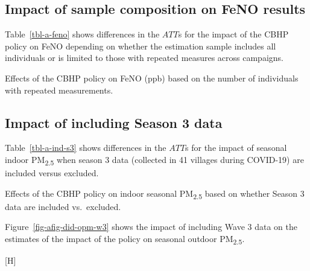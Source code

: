 \documentclass[
  letterpaper,
  DIV=11,
  numbers=noendperiod]{scrartcl}
\makeatletter
\renewenvironment{table}%
   {\renewcommand\familydefault\sfdefault
    \@float{table}}
   {\end@float}
\renewenvironment{figure}%
   {\renewcommand\familydefault\sfdefault
    \@float{figure}}
   {\end@float}
\makeatother
\begin{document}
\newpage

\subsection{Impact of sample composition on FeNO
results}\label{impact-of-sample-composition-on-feno-results}

Table~\ref{tbl-a-feno} shows differences in the \(ATT\)s for the impact
of the CBHP policy on FeNO depending on whether the estimation sample
includes all individuals or is limited to those with repeated measures
across campaigns.

\begin{table}

\caption{\label{tbl-a-feno}Effects of the CBHP policy on FeNO (ppb)
based on the number of individuals with repeated measurements.}

\centering{

}

\end{table}%

\newpage

\subsection{Impact of including Season 3
data}\label{impact-of-including-season-3-data}

Table~\ref{tbl-a-ind-s3} shows differences in the \(ATT\)s for the
impact of seasonal indoor PM\textsubscript{2.5} when season 3 data
(collected in 41 villages during COVID-19) are included versus excluded.

\begin{table}

\caption{\label{tbl-a-ind-s3}Effects of the CBHP policy on indoor
seasonal PM\textsubscript{2.5} based on whether Season 3 data are
included vs.~excluded.}

\centering{

}

\end{table}%

Figure~\ref{fig-afig-did-opm-w3} shows the impact of including Wave 3
data on the estimates of the impact of the policy on seasonal outdoor
PM\textsubscript{2.5}.

\begin{figure}[H]


\caption{\label{fig-afig-did-opm-w3}Effects of the CBHP policy on
outdoor seasonal PM\textsubscript{2.5} based on whether Season 3 data
are included vs.~excluded.}

\end{figure}%
\end{document}

